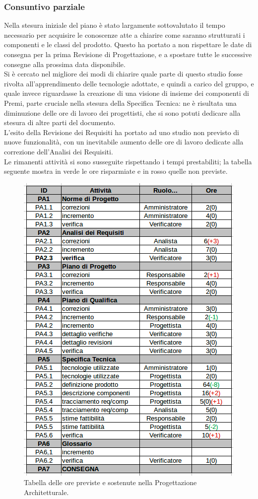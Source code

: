 \subsubsection{Consuntivo parziale}
Nella stesura iniziale del piano è stato largamente sottovalutato il tempo necessario per acquisire le conoscenze atte a chiarire come saranno strutturati i componenti e le classi del prodotto. Questo ha portato a non rispettare le date di consegna per la prima Revisione di Progettazione, e a spostare tutte le successive consegne alla prossima data disponibile. \\
Si è cercato nel migliore dei modi di chiarire quale parte di questo studio fosse rivolta all'apprendimento delle tecnologie adottate, e quindi a carico del gruppo, e quale invece riguardasse la creazione di una visione di insieme dei componenti di Premi, parte cruciale nella stesura della Specifica Tecnica: ne è risultata una diminuzione delle ore di lavoro dei progettisti, che si sono potuti dedicare alla stesura di altre parti del documento. \\
L'esito della Revisione dei Requisiti ha portato ad uno studio non previsto di nuove funzionalità, con un inevitabile aumento delle ore di lavoro dedicate alla correzione dell'Analisi dei Requisiti. \\
Le rimanenti attività si sono susseguite rispettando i tempi prestabiliti; la tabella seguente mostra in verde le ore risparmiate e in rosso quelle non previste. \\
\clearpage
\begin{figure}[H]
\begin{center}
\includegraphics[scale=0.75]{img/consuntivo-progarc.png}
\caption{Tabella delle ore previste e sostenute nella Progettazione Architetturale.}
\end{center}
\end{figure}

